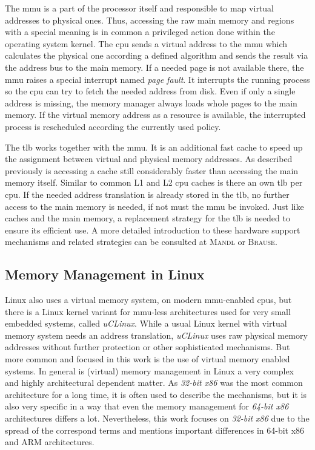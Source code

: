 The \ac{mmu} is a part of the processor itself and responsible to map virtual addresses to physical ones. 
Thus, accessing the raw main memory and regions with a special meaning is in common a privileged action done within the operating system kernel. 
The \ac{cpu} sends a virtual address to the \ac{mmu} which calculates the physical one according a defined algorithm and sends the result via the address bus to the main memory.
If a needed page is not available there, the \ac{mmu} raises a special interrupt named \textit{page fault}.
It interrupts the running process so the \ac{cpu} can try to fetch the needed address from disk.
Even if only a single address is missing, the memory manager always loads whole pages to the main memory.
If the virtual memory address as a resource is available, the interrupted process is rescheduled according the currently used policy\cite{mandl2014Grundkurs}.

The \ac{tlb} works together with the \ac{mmu}.
It is an additional fast cache to speed up the assignment between virtual and physical memory addresses. 
As described previously is accessing a cache still considerably faster than accessing the main memory itself.
Similar to common L1 and L2 \ac{cpu} caches is there an own \ac{tlb} per \ac{cpu}.
If the needed address translation is already stored in the \ac{tlb}, no further access to the main memory is needed, if not must the \ac{mmu} be invoked.
Just like caches and the main memory, a replacement strategy for the \ac{tlb} is needed to ensure its efficient use.
A more detailed introduction to these hardware support mechanisms and related strategies can be consulted at \textsc{Mandl}\cite{mandl2014Grundkurs} or \textsc{Brause}\cite{brause2017betriebssysteme}.

 
\subsection{Memory Management in Linux}\label{sec:mm:linux}
Linux also uses a virtual memory system, on modern \ac{mmu}-enabled \acp{cpu}, but there is a Linux kernel variant for \ac{mmu}-less architectures used for very small embedded systems, called \textit{uCLinux}.
While a usual Linux kernel with virtual memory system needs an address translation, \textit{uCLinux} uses raw physical memory addresses without further protection or other sophisticated mechanisms.
But more common and focused in this work is the use of virtual memory enabled systems\cite{lfd430}.
In general is (virtual) memory management in Linux a very complex and highly architectural dependent matter.
As \textit{32-bit x86} was the most common architecture for a long time, it is often used to describe the mechanisms, but it is also very specific in a way that even the memory management for \textit{64-bit x86} architectures differs a lot.
Nevertheless, this work focuses on \textit{32-bit x86} due to the spread of the correspond terms and mentions important differences in 64-bit x86 and ARM architectures.


